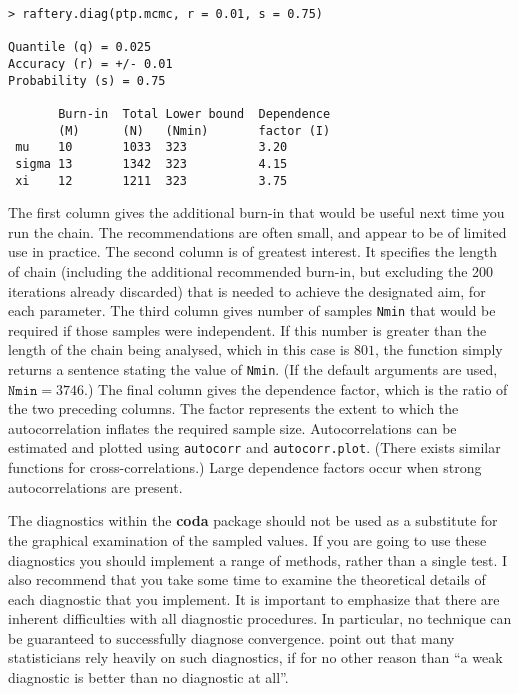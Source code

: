\documentclass[11pt,a4paper]{article}
\begin{document}
\begin{verbatim}
> raftery.diag(ptp.mcmc, r = 0.01, s = 0.75)

Quantile (q) = 0.025
Accuracy (r) = +/- 0.01
Probability (s) = 0.75 
                                             
       Burn-in  Total Lower bound  Dependence
       (M)      (N)   (Nmin)       factor (I)
 mu    10       1033  323          3.20      
 sigma 13       1342  323          4.15      
 xi    12       1211  323          3.75  
\end{verbatim}

The first column gives the additional burn-in that would be useful
next time you run the chain.  The recommendations are often small, and
appear to be of limited use in practice.  The second column is of
greatest interest.  It specifies the length of chain (including the
additional recommended burn-in, but excluding the 200 iterations
already discarded) that is needed to achieve the designated aim, for
each parameter.  The third column gives number of samples \verb+Nmin+
that would be required if those samples were independent.  If this
number is greater than the length of the chain being analysed, which
in this case is $801$, the function simply returns a sentence stating
the value of \verb+Nmin+.  (If the default arguments are used,
$\texttt{Nmin}= 3746$.)  The final column gives the dependence factor,
which is the ratio of the two preceding columns.  The factor
represents the extent to which the autocorrelation inflates the
required sample size.  Autocorrelations can be estimated and plotted
using \verb+autocorr+ and \verb+autocorr.plot+.  (There exists similar
functions for cross-correlations.)  Large dependence factors occur
when strong autocorrelations are present.

The diagnostics within the \textbf{coda} package should not be used as
a substitute for the graphical examination of the sampled values.  If
you are going to use these diagnostics you should implement a range of
methods, rather than a single test.  I also recommend that you take
some time to examine the theoretical details of each diagnostic that
you implement.  It is important to emphasize that there are inherent
difficulties with all diagnostic procedures.  In particular, no
technique can be guaranteed to successfully diagnose convergence.
\citet{cowlcarl96} point out that many statisticians rely heavily on
such diagnostics, if for no other reason than ``a weak diagnostic is
better than no diagnostic at all''.
\end{document}
